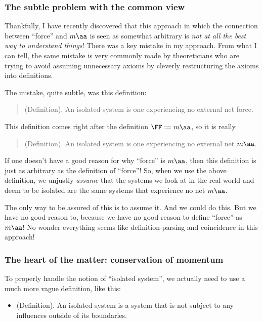 \documentclass{article}
\begin{document}
\subsubsection*{The subtle problem with the common view}

Thankfully, I have recently discovered that this approach in which the connection between ``force'' and $m\aa$ is seen as somewhat arbitrary is \textit{not at all the best way to understand things}! There was a key mistake in my approach. From what I can tell, the same mistake is very commonly made by theoreticians who are trying to avoid assuming unnecessary axioms by cleverly restructuring the axioms into definitions.

The mistake, quite subtle, was this definition:

\begin{quote}
    (Definition). An isolated system is one experiencing no external net force.
\end{quote}

This definition comes right after the definition $\FF := m\aa$, so it is really

\begin{quote}
    (Definition). An isolated system is one experiencing no external net $m\aa$.
\end{quote}

If one doesn't have a good reason for why ``force'' is $m\aa$, then this definition is just as arbitrary as the definition of ``force''! So, when we use the above definition, we unjustly \textit{assume} that the systems we look at in the real world and deem to be isolated are the same systems that experience no net $m\aa$. 

The only way to be assured of this is to assume it. And we could do this. But we have no good reason to, because we have no good reason to define ``force'' as $m\aa$! No wonder everything seems like definition-parsing and coincidence in this approach!

\subsubsection*{The heart of the matter: conservation of momentum}

To properly handle the notion of ``isolated system'', we actually need to use a much more vague definition, like this:

\begin{itemize}
    \item (Definition). An isolated system is a system that is not subject to any influences outside of its boundaries.
\end{itemize}
\end{document}
